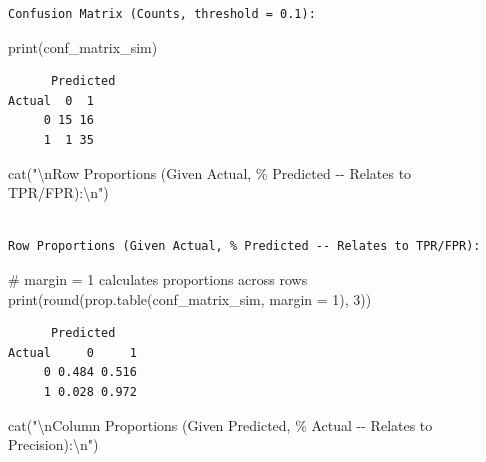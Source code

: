 \documentclass[
  letterpaper,
]{scrbook}
\newenvironment{Shaded}{\begin{snugshade}}{\end{snugshade}}
\newcommand{\AttributeTok}[1]{\textcolor[rgb]{0.40,0.45,0.13}{#1}}
\newcommand{\CommentTok}[1]{\textcolor[rgb]{0.37,0.37,0.37}{#1}}
\newcommand{\DecValTok}[1]{\textcolor[rgb]{0.68,0.00,0.00}{#1}}
\newcommand{\FunctionTok}[1]{\textcolor[rgb]{0.28,0.35,0.67}{#1}}
\newcommand{\NormalTok}[1]{\textcolor[rgb]{0.00,0.23,0.31}{#1}}
\newcommand{\SpecialCharTok}[1]{\textcolor[rgb]{0.37,0.37,0.37}{#1}}
\newcommand{\StringTok}[1]{\textcolor[rgb]{0.13,0.47,0.30}{#1}}
\begin{document}
\begin{verbatim}
Confusion Matrix (Counts, threshold = 0.1):
\end{verbatim}

\begin{Shaded}
\begin{Highlighting}[]
\FunctionTok{print}\NormalTok{(conf\_matrix\_sim)}
\end{Highlighting}
\end{Shaded}

\begin{verbatim}
      Predicted
Actual  0  1
     0 15 16
     1  1 35
\end{verbatim}

\begin{Shaded}
\begin{Highlighting}[]
\FunctionTok{cat}\NormalTok{(}\StringTok{"}\SpecialCharTok{\textbackslash{}n}\StringTok{Row Proportions (Given Actual, \% Predicted {-}{-} Relates to TPR/FPR):}\SpecialCharTok{\textbackslash{}n}\StringTok{"}\NormalTok{)}
\end{Highlighting}
\end{Shaded}

\begin{verbatim}

Row Proportions (Given Actual, % Predicted -- Relates to TPR/FPR):
\end{verbatim}

\begin{Shaded}
\begin{Highlighting}[]
\CommentTok{\# margin = 1 calculates proportions across rows}
\FunctionTok{print}\NormalTok{(}\FunctionTok{round}\NormalTok{(}\FunctionTok{prop.table}\NormalTok{(conf\_matrix\_sim, }\AttributeTok{margin =} \DecValTok{1}\NormalTok{), }\DecValTok{3}\NormalTok{))}
\end{Highlighting}
\end{Shaded}

\begin{verbatim}
      Predicted
Actual     0     1
     0 0.484 0.516
     1 0.028 0.972
\end{verbatim}

\begin{Shaded}
\begin{Highlighting}[]
\FunctionTok{cat}\NormalTok{(}\StringTok{"}\SpecialCharTok{\textbackslash{}n}\StringTok{Column Proportions (Given Predicted, \% Actual {-}{-} Relates to Precision):}\SpecialCharTok{\textbackslash{}n}\StringTok{"}\NormalTok{)}
\end{Highlighting}
\end{Shaded}
\end{document}
